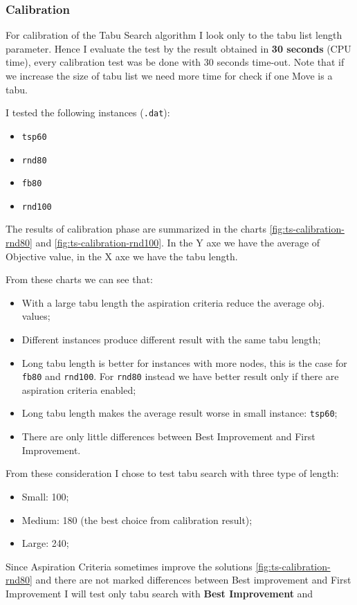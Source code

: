 	\subsubsection{Calibration}
	\label{subsec:calibration}
	For calibration of the Tabu Search algorithm I look only to the tabu list length parameter. Hence I evaluate the test by the result obtained in \textbf{30 seconds} (CPU time),  every calibration test was be done with 30 seconds time-out. Note that if we increase the size of tabu list we need more time for check if one Move is a tabu.
	
	I tested the following instances (\verb|.dat|):
	\begin{itemize}
		\item \verb|tsp60|
		\item \verb|rnd80|
		\item \verb|fb80|
		\item \verb|rnd100|
	\end{itemize}
	
	The results of calibration phase are summarized in the charts \ref{fig:ts-calibration-rnd80} and \ref{fig:ts-calibration-rnd100}. In the Y axe we have the average of Objective value, in the X axe we have the tabu length.
	
	From these charts we can see that:
	\begin{itemize}
		\item With a large tabu length the aspiration criteria reduce the average obj. values;
		\item Different instances produce different result with the same tabu length;
		\item Long tabu length is better for instances with more nodes, this is the case for \verb|fb80| and \verb|rnd100|. For \verb|rnd80| instead we have better result only if there are aspiration criteria enabled;
		\item Long tabu length makes the average result worse in small instance: \verb|tsp60|;
		\item There are only little differences between Best Improvement and First Improvement. 
	\end{itemize}
	
	From these consideration I chose to test tabu search with three type of length:
	\begin{itemize}
		\item Small: 100;
		\item Medium: 180 (the best choice from calibration result);
		\item Large: 240;
	\end{itemize}
	Since Aspiration Criteria sometimes improve the solutions \ref{fig:ts-calibration-rnd80} and there are not marked differences between Best improvement and First Improvement I will test only tabu search with \textbf{Best Improvement} and 
	

